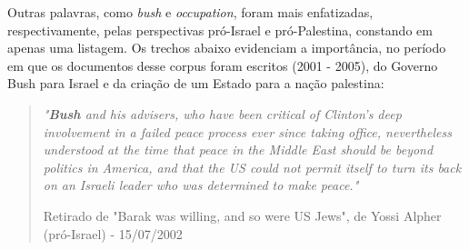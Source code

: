 
Outras palavras, como \emph{bush} e \emph{occupation}, foram mais enfatizadas, respectivamente, pelas perspectivas pró-Israel e pró-Palestina, constando em apenas uma listagem. Os trechos abaixo evidenciam a importância, no período em que os documentos desse corpus foram escritos (2001 - 2005), do Governo Bush para Israel e da criação de um Estado para a nação palestina:









\begin{quote}
\emph{"\textbf{Bush} and his advisers, who have been critical of Clinton's deep involvement
in a failed peace process ever since taking office, nevertheless
understood at the time that peace in the Middle East should be beyond
politics in America, and that the US could not permit itself to turn its
back on an Israeli leader who was determined to make peace."} 

{\small Retirado de "Barak was willing, and so were US Jews", de Yossi Alpher (pró-Israel) - 15/07/2002}
\end{quote}

